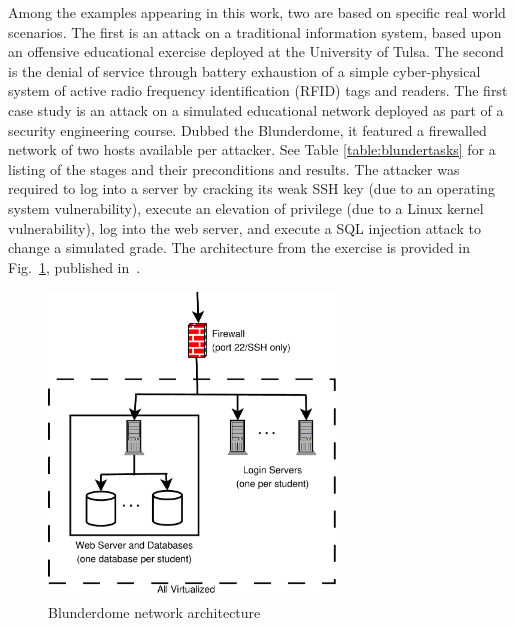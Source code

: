 Among the examples appearing in this work, two are based on specific real world
scenarios.
The first is an attack on a traditional information system, based upon an offensive educational exercise
deployed at the University of Tulsa. The second is the 
denial of service through battery exhaustion of a simple
cyber-physical system of active radio frequency identification (RFID) tags and readers.
\label{sec:blunderdome}
The first case study is an attack on a simulated educational network deployed as part of a
security engineering course. Dubbed the Blunderdome, it featured a firewalled network of
two hosts available per attacker. See Table \ref{table:blundertasks} for a listing of the stages and
their preconditions and results. The attacker was required to log into a server by cracking
its weak SSH key (due to an operating system vulnerability), execute an elevation of privilege (due
to a Linux kernel vulnerability), log into the web server, and execute a SQL injection attack to
change a simulated grade. The architecture from the exercise is provided in 
Fig.~\ref{fig:blunderarch}, published in~\cite{louthan2010blunderdome}.

\begin{figure}
\centering
\includegraphics[width=3in]{blunderarch}
\caption{Blunderdome network architecture}
\label{fig:blunderarch}
\end{figure}

